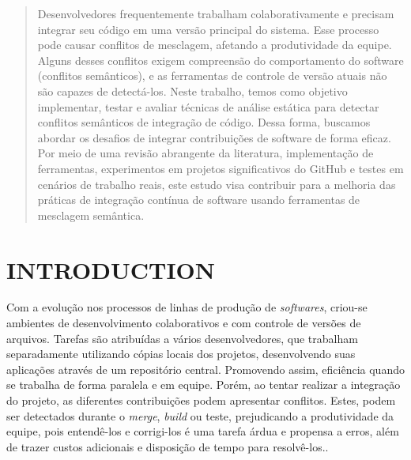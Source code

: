 \documentclass[sigconf,review]{acmart}
\begin{document}
\begin{abstract}

Desenvolvedores frequentemente trabalham colaborativamente e precisam integrar seu código em uma versão principal do sistema. Esse processo pode causar conflitos de mesclagem, afetando a produtividade da equipe. Alguns desses conflitos exigem compreensão do comportamento do software (conflitos semânticos), e as ferramentas de controle de versão atuais não são capazes de detectá-los. Neste trabalho, temos como objetivo implementar, testar e avaliar técnicas de análise estática para detectar conflitos semânticos de integração de código. Dessa forma, buscamos abordar os desafios de integrar contribuições de software de forma eficaz. Por meio de uma revisão abrangente da literatura, implementação de ferramentas, experimentos em projetos significativos do GitHub e testes em cenários de trabalho reais, este estudo visa contribuir para a melhoria das práticas de integração contínua de software usando ferramentas de mesclagem semântica.
\end{abstract}




\maketitle

\section{INTRODUCTION}

Com a evolução nos processos de linhas de produção de \emph{softwares}, criou-se ambientes de desenvolvimento colaborativos e com controle de versões de arquivos. Tarefas são atribuídas a vários desenvolvedores, que trabalham separadamente utilizando cópias locais dos projetos, desenvolvendo suas aplicações através de um repositório central. Promovendo assim, eficiência quando se trabalha de forma paralela e em equipe. Porém, ao tentar realizar a integração do projeto, as diferentes contribuições podem apresentar conflitos. Estes, podem ser detectados durante o \textit{merge}, \textit{build} ou teste, prejudicando a produtividade da equipe, pois entendê-los e corrigi-los é uma tarefa árdua e propensa a erros, além de trazer custos adicionais e disposição de tempo para resolvê-los.\cite{mens2002state, zimmermann2007mining, bird2012assessing, brun2013early}.
\end{document}
